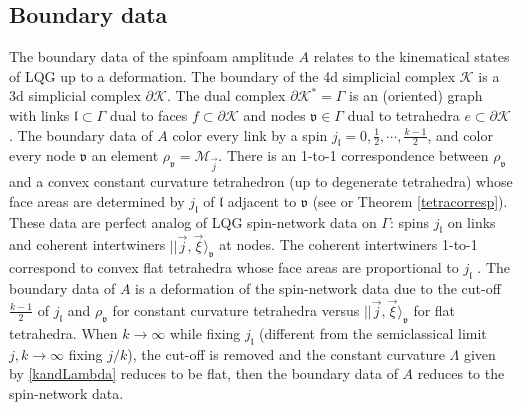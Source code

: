 \documentclass[aps,prd,notitlepage,nofootinbib,superscriptaddress,groupedaddress,twocolumn]{revtex4-1}
\newcommand{\ck}{\mathcal K}
\newcommand{\cm}{\mathcal M}
\newcommand{\fl}{\mathfrak{l}}  \newcommand{\Fl}{\mathfrak{L}}
\newcommand{\fv}{\mathfrak{v}}  \newcommand{\Fv}{\mathfrak{V}}
\newcommand{\G}{\Gamma}
\renewcommand{\L }{\Lambda}
\begin{document}

\subsection{Boundary data}\label{Boundary data}


The boundary data of the spinfoam amplitude $A$ relates to the kinematical states of LQG up to a deformation. The boundary of the 4d simplicial complex $\ck$ is a 3d simplicial complex $\partial\ck$. The dual complex $\partial\ck^*=\G$ is an (oriented) graph with links $\fl\subset \G$ dual to faces $f\subset \partial\ck$ and nodes $\fv\in\G$ dual to tetrahedra $e\subset\partial \ck$. The boundary data of $A$ color every link by a spin $j_\fl=0,\frac{1}{2},\cdots,\frac{k-1}{2}$, and color every node $\fv$ an element $\rho_\fv=\cm_{\vec j}$. %
There is an 1-to-1 correspondence between $\rho_\fv$ and a convex constant curvature tetrahedron (up to degenerate tetrahedra) whose face areas are determined by $j_\fl$ of $\fl$ adjacent to $\fv$ (see \cite{curvedMink} or Theorem \ref{tetracorresp}). These data are perfect analog of LQG spin-network data on $\G$: spins $j_\fl$ on links and coherent intertwiners $||\vec{j},\vec{\xi}\rangle_\fv$ at nodes. The coherent intertwiners 1-to-1 correspond to convex flat tetrahedra whose face areas are proportional to $j_\fl$ \cite{LS,shape,CF}. The boundary data of $A$ is a deformation of the spin-network data due to the cut-off $\frac{k-1}{2}$ of $j_\fl$ and $\rho_\fv$ for constant curvature tetrahedra versus $||\vec{j},\vec{\xi}\rangle_\fv$ for flat tetrahedra. When $k\to\infty$ while fixing $j_\fl$ (different from the semiclassical limit $j,k\to\infty$ fixing $j/k$), the cut-off is removed and the constant curvature $\L$ given by \eqref{kandLambda} reduces to be flat, then the boundary data of $A$ reduces to the spin-network data. 
\end{document}

